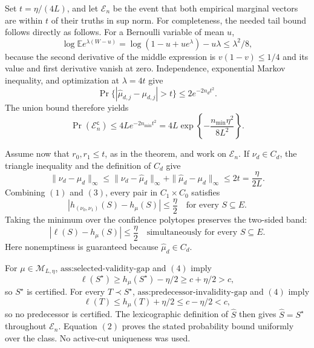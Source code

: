 Set \(t=\eta/(4L)\), and let \(\mathcal E_n\) be the event that both empirical marginal vectors are within \(t\) of their truths in sup norm.  For completeness, the needed tail bound follows directly as follows.  For a Bernoulli variable of mean \(u\),
\[
\log\mathbb E e^{\lambda(W-u)}
=\log(1-u+ue^\lambda)-u\lambda\leq\lambda^2/8,
\]
because the second derivative of the middle expression is \(v(1-v)\leq1/4\) and its value and first derivative vanish at zero.  Independence, exponential Markov inequality, and optimization at \(\lambda=4t\) give
\[
\Pr\{|\widehat\mu_{d,j}-\mu_{d,j}|>t\}\leq2e^{-2n_dt^2}.
\]
The union bound therefore yields
\[
\Pr(\mathcal E_n^{\mathsf c})
\leq4L e^{-2n_{\min}t^2}
=4L\exp\!\left\{-\frac{n_{\min}\eta^2}{8L^2}\right\}. \tag{2}
\]

Assume now that \(r_0,r_1\leq t\), as in the theorem, and work on \(\mathcal E_n\).  If \(\nu_d\in C_d\), the triangle inequality and the definition of \(C_d\) give
\[
\|\nu_d-\mu_d\|_\infty
\leq\|\nu_d-\widehat\mu_d\|_\infty
+\|\widehat\mu_d-\mu_d\|_\infty
\leq2t=\frac{\eta}{2L}. \tag{3}
\]
Combining \((1)\) and \((3)\), every pair in \(C_1\times C_0\) satisfies
\[
|h_{(\nu_0,\nu_1)}(S)-h_{\mu}(S)|\leq\frac\eta2
\quad\text{for every }S\subseteq E.
\]
Taking the minimum over the confidence polytopes preserves the two-sided band:
\[
|\ell(S)-h_{\mu}(S)|\leq\frac\eta2
\quad\text{simultaneously for every }S\subseteq E. \tag{4}
\]
Here nonemptiness is guaranteed because \(\widehat\mu_d\in C_d\).

For \(\mu\in\mathcal M_{L,\eta}\), \(\text{ass:selected-validity-gap}\) and \((4)\) imply
\[
\ell(S^\star)\geq h_{\mu}(S^\star)-\eta/2\geq c+\eta/2>c,
\]
so \(S^\star\) is certified.  For every \(T\prec S^\star\), \(\text{ass:predecessor-invalidity-gap}\) and \((4)\) imply
\[
\ell(T)\leq h_{\mu}(T)+\eta/2\leq c-\eta/2<c,
\]
so no predecessor is certified.  The lexicographic definition of \(\widehat S\) then gives \(\widehat S=S^\star\) throughout \(\mathcal E_n\).  Equation \((2)\) proves the stated probability bound uniformly over the class.  No active-cut uniqueness was used.


